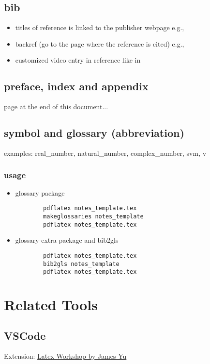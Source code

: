 \subsection{bib}
\begin{itemize}
	\item titles of reference is linked to the publisher webpage e.g., \cite{kitaev2002classical}
	\item backref (go to the page where the reference is cited) e.g., \cite{childsUniversalComputationQuantum2009}
	\item customized video entry in reference like in \cite{babaiGraphIsomorphismQuasipolynomial2016}
\end{itemize}

\subsection{preface, index and appendix}
 page at the end of this document...

\subsection{symbol and glossary (abbreviation)}
examples: \gls{real_number},
\gls{natural_number},
\gls{complex_number},
\gls{svm},
\gls{v}

\subsubsection{usage}
\begin{itemize}
	\item glossary package 
	\begin{verbatim}
		pdflatex notes_template.tex
		makeglossaries notes_template
		pdflatex notes_template.tex	
	\end{verbatim}

	\item glossary-extra package and bib2gls
	\begin{verbatim}
		pdflatex notes_template.tex
		bib2gls notes_template
		pdflatex notes_template.tex	
	\end{verbatim}
\end{itemize}

\section{Related Tools}
\subsection{VSCode}
Extension: \href{https://marketplace.visualstudio.com/items?itemName=James-Yu.latex-workshop}{Latex Workshop by James Yu}

